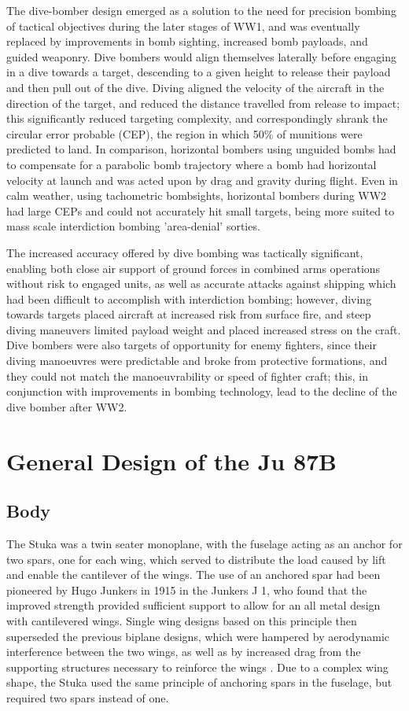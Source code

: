 \documentclass[a4paper, fontsize=11pt]{scrartcl} %
\begin{document}
The dive-bomber design emerged as a solution to the need for precision
bombing of tactical objectives during the later stages of
WW1, and was eventually replaced by improvements in bomb sighting,
increased bomb payloads, and guided weaponry. Dive bombers would align themselves
laterally before engaging in a dive towards a target,
descending to a given height to release their payload and then pull
out of the dive. Diving aligned the velocity of the aircraft in the
direction of the target, and reduced the distance travelled from release
to impact; this significantly reduced targeting complexity, and
correspondingly shrank the circular error probable (CEP), the
region in which 50\% of munitions were predicted to land. In comparison,
horizontal bombers using unguided bombs had to compensate for a parabolic
bomb trajectory where a bomb had horizontal velocity at launch and was
acted upon by drag and gravity during flight. Even in
calm weather, using tachometric bombsights, horizontal bombers during
WW2 had large CEPs and could not accurately hit small targets, being
more suited to mass scale interdiction bombing 'area-denial' sorties.

The increased accuracy offered by dive bombing was tactically
significant, enabling both close air support
of ground forces in combined arms operations without risk to engaged
units, as well as accurate attacks against shipping which had been
difficult to accomplish with interdiction bombing; however, diving
towards targets placed aircraft at increased risk from surface fire, and
steep diving maneuvers limited payload weight and placed increased
stress on the craft. Dive bombers were also targets of opportunity for
enemy fighters, since their diving manoeuvres were predictable and broke from
protective formations, and they could not match the manoeuvrability or
speed of fighter craft; this, in conjunction with improvements in
bombing technology, lead to the decline of the dive bomber after WW2.
\section{General Design of the Ju 87B}
\subsection{Body}
The Stuka was a twin seater monoplane, with the fuselage acting as an
anchor for two spars, one for each wing, which served to distribute the
load caused by lift and enable the cantilever of the wings.
The use of an anchored spar had been pioneered by Hugo Junkers in 1915
\autocite{nasa4} in the Junkers J 1, who found that the improved
strength provided sufficient support to allow for an
all metal design with cantilevered wings. Single wing designs based on
this principle then superseded the previous biplane designs, which were
hampered by aerodynamic interference between the two wings, as well as
by increased drag from the supporting structures necessary to reinforce
the wings \autocite[p~.37]{peery12}. Due to a complex wing shape, the
Stuka used the same principle of anchoring spars in the fuselage, but
required two spars instead of one.
\end{document}
